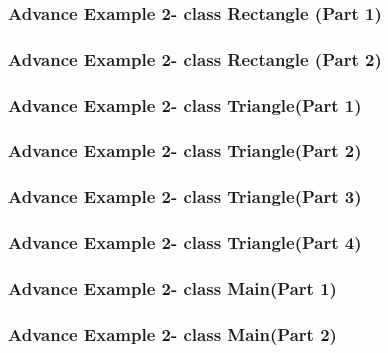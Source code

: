 \documentclass[11pt]{beamer}
\begin{document}
\begin{frame}
\frametitle{Advance Example 2- class Rectangle (Part 1)}

\end{frame}

\begin{frame}
\frametitle{Advance Example 2- class Rectangle (Part 2)}

\end{frame}

\begin{frame}
\frametitle{Advance Example 2- class Triangle(Part 1)}

\end{frame}
\begin{frame}
\frametitle{Advance Example 2- class Triangle(Part 2)}

\end{frame}

\begin{frame}
\frametitle{Advance Example 2- class Triangle(Part 3)}

\end{frame}
\begin{frame}
\frametitle{Advance Example 2- class Triangle(Part 4)}

\end{frame}

\begin{frame}
\frametitle{Advance Example 2- class Main(Part 1)}

\end{frame}

\begin{frame}
\frametitle{Advance Example 2- class Main(Part 2)}

\end{frame}
\end{document}
